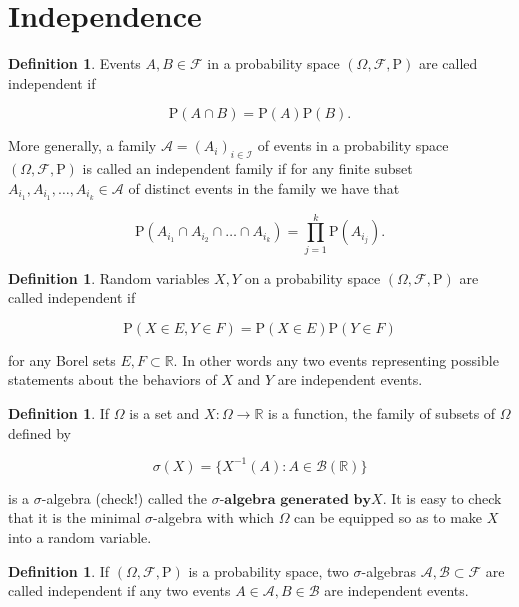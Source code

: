 \documentclass[11pt]{report}
\providecommand{\cal}{\mathcal}
\newcommand{\R}{\mathbb{R}}
\theoremstyle{plain}
\theoremstyle{definition}
\newtheorem{defn}[thm]{Definition}
\begin{document}
\section{Independence}

\begin{defn}
Events $A, B \in {\cal F}$ in a probability space
$(\Omega, {\cal F}, \mathrm{P})$ are called
independent if

\[
\mathrm{P}(A\cap B) = \mathrm{P}(A)\mathrm{P}(B).
\]

\noindent More generally, a family
${\cal A}=(A_i)_{i\in {\cal I}}$ of events in a
probability space $(\Omega, {\cal F}, \mathrm{P})$ is
called an independent family if for any finite subset
$A_{i_1}, A_{i_1}, \ldots, A_{i_k} \in {\cal A}$ of
distinct events in the family we have that

\[
\mathrm{P}(A_{i_1} \cap A_{i_2} \cap \ldots \cap A_{i_k}) = \prod_{j=1}^k \mathrm{P}(A_{i_j}).
\]

\end{defn}

\begin{defn}
Random variables $X, Y$ on a probability space
$(\Omega, {\cal F}, \mathrm{P})$ are called
independent if

\[
\mathrm{P}(X \in E, Y \in F) = \mathrm{P}(X\in E)\mathrm{P}(Y\in F)
\]

\noindent for any Borel sets $E,F \subset \R$. In other words
any two events representing possible statements about
the behaviors of $X$ and $Y$ are independent events.
\end{defn}

\begin{defn}
If $\Omega$ is a set and $X:\Omega\to\R$ is a
function, the family of subsets of $\Omega$ defined
by

\[
\sigma(X) = \Big\{ X^{-1}(A) : A \in {\cal B}(\R) \Big\}
\]

\noindent is a $\sigma$-algebra (check!) called the
$\textbf{$\sigma$-algebra generated by$X$}$. It is
easy to check that it is the minimal $\sigma$-algebra
with which $\Omega$ can be equipped so as to make $X$
into a random variable.
\end{defn}

\begin{defn}
If $(\Omega, {\cal F}, \mathrm{P})$ is a probability
space, two $\sigma$-algebras
${\cal A}, {\cal B}\subset {\cal F}$ are called
independent if any two events
$A\in {\cal A}, B\in{\cal B}$ are independent events.
\end{defn}
\end{document}
